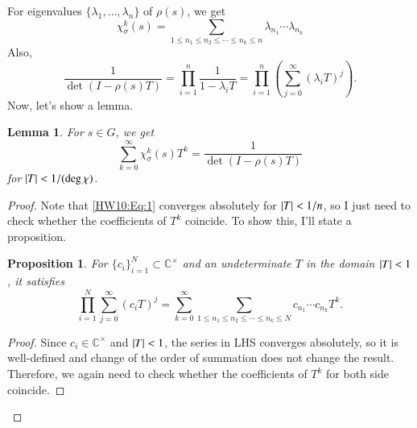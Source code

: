 \documentclass[a4paper, 12pt]{article}
\theoremstyle{Mydefinition}
\theoremstyle{Mytheorem}
\newtheorem{proposition}[statement]{Proposition}
\newtheorem{lemma}[statement]{Lemma}
\begin{document}
\begin{enumerate}
For eigenvalues $\{\lambda_1, \ldots, \lambda_n\}$ of $\rho(s)$, we get
\begin{equation}\label{HW10:Eq:6}
    \chi_\sigma^k(s) = \sum_{1\leq n_1\leq n_2\leq \cdots\leq n_k\leq n}\lambda_{n_1}\cdots \lambda_{n_k}
\end{equation}
Also,
\begin{equation}\label{HW10:Eq:1}
    \frac{1}{\det(I-\rho(s)T)} = \prod_{i=1}^n\frac{1}{1-\lambda_iT} = \prod_{i=1}^n\left(\sum_{j=0}^\infty (\lambda_iT)^j\right).
\end{equation}
Now, let's show a lemma.
\begin{lemma}
    For $s\in G$, we get
    \begin{equation}\label{HW10:Eq:2}
        \sum_{k=0}^\infty \chi_\sigma^k(s) T^k = \frac{1}{\det(I-\rho(s)T)}
    \end{equation}
    for $\abs{T}<1/(\deg \chi)$.
\end{lemma}
\begin{proof}
Note that \eqref{HW10:Eq:1} converges absolutely for $\abs{T}<1/n$, so I just need to check whether the coefficients of $T^k$ coincide. To show this, I'll state a proposition.
\begin{proposition}
For $\{c_i\}_{i=1}^N\subset \mathbb{C}^\times$ and an undeterminate $T$ in the domain $\abs{T}<1$, it satisfies
\begin{equation}\label{HW10:Eq:4}
    \prod_{i=1}^N\sum_{j=0}^\infty (c_iT)^j = \sum_{k=0}^\infty \sum_{1\leq n_1\leq n_2\leq \cdots\leq n_k\leq N}c_{n_1}\cdots c_{n_k}T^k.
\end{equation}
\end{proposition}
\begin{proof}
Since $c_i\in\mathbb{C}^\times$ and $\abs{T}<1$, the series in LHS converges absolutely, so it is well-defined and change of the order of summation does not change the result. Therefore, we again need to check whether the coefficients of $T^k$ for both side coincide.


\end{proof}
\end{proof}
\end{enumerate}
\end{document}
